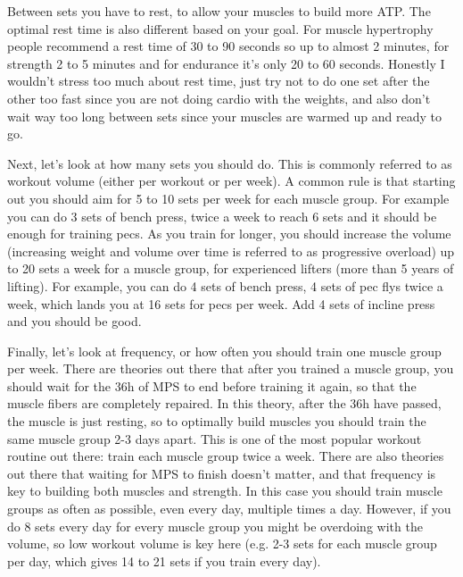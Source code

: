 \documentclass[openany, 12pt]{book}
\begin{document}
        Between sets you have to rest, to allow your muscles to build more ATP. The optimal rest time is also different based on your goal. For muscle hypertrophy people recommend a rest time of
        30 to 90 seconds so up to almost 2 minutes, for strength 2 to 5 minutes and for endurance it's only 20 to 60 seconds. Honestly I wouldn't stress too much about rest time, just try
        not to do one set after the other too fast since you are not doing cardio with the weights, and also don't wait way too long between sets since your muscles are warmed up and ready to go.

        Next, let's look at how many sets you should do. This is commonly referred to as workout volume (either per workout or per week). A common rule is that starting out you should aim for
        5 to 10 sets per week for each muscle group. For example you can do 3 sets of bench press, twice a week to reach 6 sets and it should be enough for training pecs. As you train for longer, you
        should increase the volume (increasing weight and volume over time is referred to as progressive overload) up to 20 sets a week for a muscle group, for experienced lifters (more than 5 years of
        lifting). For example, you can do 4 sets of bench press, 4 sets of pec flys twice a week, which lands you at 16 sets for pecs per week. Add 4 sets of incline press and you should be good.

        Finally, let's look at frequency, or how often you should train one muscle group per week. There are theories out there that after you trained a muscle group, you should wait for the 36h of
        MPS to end before training it again, so that the muscle fibers are completely repaired. In this theory, after the 36h have passed, the muscle is just resting, so to optimally
        build muscles you should train the same muscle group 2-3 days apart. This is one of the most popular workout routine out there: train each muscle group twice a week.
        There are also theories out there that waiting for MPS to finish doesn't matter, and that frequency is key to building both muscles and strength. In this case you should train muscle groups as
        often as possible, even every day, multiple times a day. However, if you do 8 sets every day for every muscle group you might be overdoing with the volume, so low workout
        volume is key here (e.g. 2-3 sets for each muscle group per day, which gives 14 to 21 sets if you train every day).
\end{document}
